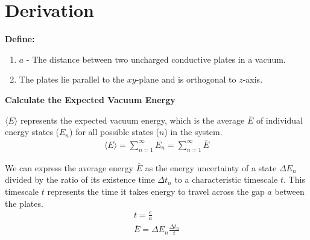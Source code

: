 \section{Derivation}
\noindent\textbf{Define:}
\begin{enumerate}
    \item $a$ - The distance between two uncharged conductive plates in a vacuum.
    \item The plates lie parallel to the \(xy\)-plane and is orthogonal to \(z\)-axis.
\end{enumerate}

\noindent\textbf{Calculate the Expected Vacuum Energy}

$\langle E \rangle$ represents the expected vacuum energy, 
which is the average $\bar E$ of individual energy states ($E_n$) for all possible states ($n$) in the system.
\begin{align}
    &\langle E \rangle = \sum_{n=1}^{\infty}E_n = \sum_{n=1}^{\infty}\bar{E}&
\end{align}

We can express the average energy $\bar E$ as the energy uncertainty of 
a state $\Delta E_n$ divided by the ratio of its existence time $\Delta t_n$ 
to a characteristic timescale $t$.
This timescale $t$ represents the time it takes energy to travel across the gap $a$ between the plates.
\begin{align}
    &t = \frac{c}{a}& \\
    &\bar{E} = \Delta E_n\frac{\Delta t_n}{t}&
\end{align}

